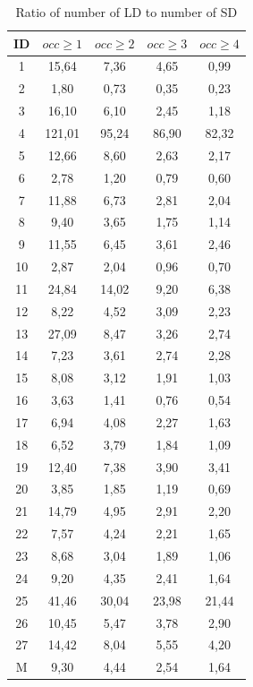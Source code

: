 \documentclass[conference]{IEEEtran}
\begin{document}
\begin{table}[!h]
\renewcommand{\arraystretch}{1.25}
\caption{Ratio of number of LD to number of SD}
\label{table:ld_ratio}
\centering
\begin{tabular}{|c|c|c|c|c|}
\hline
    ID  & $occ\geq 1$ & $occ\geq 2$ & $occ\geq 3$ & $occ\geq 4$  \\
\hline
1	&	15,64	&	7,36	&	4,65	&	0,99	\\
2	&	1,80	&	0,73	&	0,35	&	0,23	\\
3	&	16,10	&	6,10	&	2,45	&	1,18	\\
4	&	121,01	&	95,24	&	86,90	&	82,32	\\
5	&	12,66	&	8,60	&	2,63	&	2,17	\\
6	&	2,78	&	1,20	&	0,79	&	0,60	\\
7	&	11,88	&	6,73	&	2,81	&	2,04	\\
8	&	9,40	&	3,65	&	1,75	&	1,14	\\
9	&	11,55	&	6,45	&	3,61	&	2,46	\\
10	&	2,87	&	2,04	&	0,96	&	0,70	\\
11	&	24,84	&	14,02	&	9,20	&	6,38	\\
12	&	8,22	&	4,52	&	3,09	&	2,23	\\
13	&	27,09	&	8,47	&	3,26	&	2,74	\\
14	&	7,23	&	3,61	&	2,74	&	2,28	\\
15	&	8,08	&	3,12	&	1,91	&	1,03	\\
16	&	3,63	&	1,41	&	0,76	&	0,54	\\
17	&	6,94	&	4,08	&	2,27	&	1,63	\\
18	&	6,52	&	3,79	&	1,84	&	1,09	\\
19	&	12,40	&	7,38	&	3,90	&	3,41	\\
20	&	3,85	&	1,85	&	1,19	&	0,69	\\
21	&	14,79	&	4,95	&	2,91	&	2,20	\\
22	&	7,57	&	4,24	&	2,21	&	1,65	\\
23	&	8,68	&	3,04	&	1,89	&	1,06	\\
24	&	9,20	&	4,35	&	2,41	&	1,64	\\
25	&	41,46	&	30,04	&	23,98	&	21,44	\\
26	&	10,45	&	5,47	&	3,78	&	2,90	\\
27	&	14,42	&	8,04	&	5,55	&	4,20	\\

\hline
M	&	9,30	&	4,44	&	2,54	&	1,64	\\

\hline
\end{tabular}
\end{table}
\end{document}
